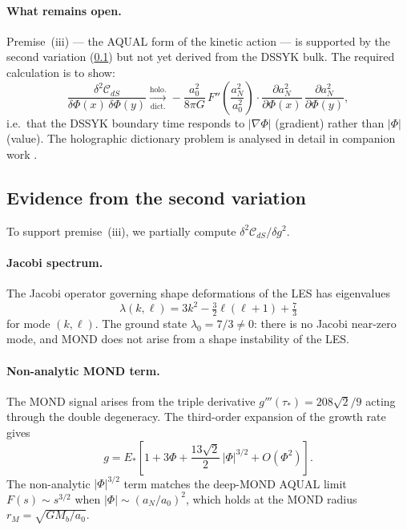 \documentclass[a4paper,11pt]{article}
\newcommand{\CdS}{\mathcal{C}_{dS}}                  %
\newcommand{\tausk}{\tau_*}                          %
\newcommand{\Estar}{E_*}                             %
\newcommand{\az}{a_0}                                %
\newcommand{\aN}{a_N}                                %
\begin{document}
\paragraph{What remains open.}
Premise~(iii) --- the AQUAL form of the kinetic action --- is supported by
the second variation (\cref{sec:second_var}) but not yet derived from the
DSSYK bulk.  The required calculation is to show:
\begin{equation}
  \frac{\delta^2\CdS}{\delta\Phi(x)\,\delta\Phi(y)}
  \xrightarrow[\text{dict.}]{\text{holo.}}
  -\frac{\az^2}{8\pi G}\,F''\!\left(\frac{\aN^2}{\az^2}\right)
  \cdot\frac{\partial\aN^2}{\partial\Phi(x)}\,\frac{\partial\aN^2}{\partial\Phi(y)},
  \label{eq:open}
\end{equation}
i.e.\ that the DSSYK boundary time responds to $|\nabla\Phi|$ (gradient)
rather than $|\Phi|$ (value).  The holographic dictionary problem is
analysed in detail in companion work \cite{CODA:dict}.

\subsection{Evidence from the second variation}
\label{sec:second_var}

To support premise~(iii), we partially compute
$\delta^2\CdS/\delta g^2$.

\paragraph{Jacobi spectrum.}
The Jacobi operator governing shape deformations of the LES has
eigenvalues
\begin{equation}
  \lambda(k,\ell) = 3k^2 - \tfrac{3}{2}\ell(\ell+1) + \tfrac{7}{3}
  \label{eq:Jacobi}
\end{equation}
for mode $(k,\ell)$.  The ground state $\lambda_0=7/3\neq0$: there is no
Jacobi near-zero mode, and MOND does not arise from a shape instability
of the LES.

\paragraph{Non-analytic MOND term.}
The MOND signal arises from the triple derivative
$g'''(\tausk)=208\sqrt{2}/9$ acting through the double degeneracy.
The third-order expansion of the growth rate gives
\begin{equation}
  g = \Estar\!\left[1 + 3\Phi
    + \frac{13\sqrt{2}}{2}\,|\Phi|^{3/2} + O(\Phi^2)\right].
  \label{eq:g_expand}
\end{equation}
The non-analytic $|\Phi|^{3/2}$ term matches the deep-MOND AQUAL limit
$F(s)\sim s^{3/2}$ when $|\Phi|\sim(\aN/\az)^2$, which holds at the
MOND radius $r_M=\sqrt{GM_b/\az}$.
\end{document}
